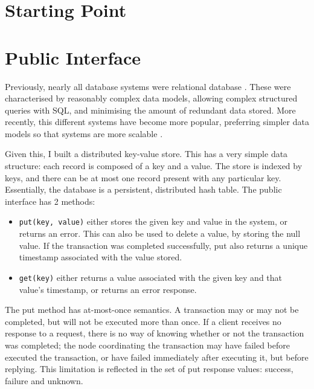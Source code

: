 \documentclass[12pt,a4paper,twoside,openright]{report}
\begin{document}

\section{Starting Point}


\section{Public Interface}

Previously, nearly all database systems were relational database \cite{lake2013}. These were characterised by reasonably complex data models, allowing complex structured queries with SQL, and minimising the amount of redundant data stored. More recently, this different systems have become more popular, preferring simpler data models so that systems are more scalable \cite{bailis2013highly}.

Given this, I built a distributed key-value store. This has a very simple data structure: each record is composed of a key and a value. The store is indexed by keys, and there can be at most one record present with any particular key. Essentially, the database is a persistent, distributed hash table. The public interface has 2 methods:

\begin{itemize}
\item
\verb|put(key, value)| either stores the given key and value in the system, or returns an error. This can also be used to delete a value, by storing the null value. If the transaction was completed successfully, put also returns a unique timestamp associated with the value stored.

\item
\verb|get(key)| either returns a value associated with the given key and that value's timestamp, or returns an error response.

\end{itemize}

The put method has at-most-once semantics. A transaction may or may not be completed, but will not be executed more than once. If a client receives no response to a request, there is no way of knowing whether or not the transaction was completed; the node coordinating the transaction may have failed before executed the transaction, or have failed immediately after executing it, but before replying. This limitation is reflected in the set of put response values: success, failure and unknown.
\end{document}
